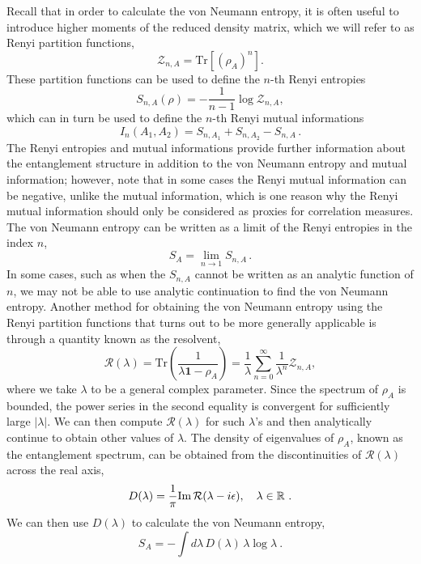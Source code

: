 \documentclass[a4paper,11pt]{article}
\newcommand\field[1]{{\ensuremath{\mathbb{{#1}}}}}
\newcommand{\RR}{\field{R}}
\newcommand{\be}{\begin{equation}}
\newcommand{\ee}{\end{equation}}
\newcommand\lam{\lambda}
\newcommand\sR{{\mathcal R}}
\newcommand\sZ{{\mathcal Z}}
\begin{document}
Recall that in order to calculate the von Neumann entropy, it is often useful to introduce higher moments of the reduced density matrix, which we will refer to as Renyi partition functions, 
 \be 
 \sZ_{n, A} = \text{Tr}[(\rho_{A})^n].
 \ee
 These partition functions can be used to define the $n$-th Renyi entropies 
 \be 
 S_{n, A}(\rho)= -\frac{1}{n-1}\log \sZ_{n, A}, 
 \ee
 which can in turn be used to define the $n$-th Renyi mutual informations
 \be 
I_n(A_1, A_2) = S_{n, A_1} +S_{n, A_2} - S_{n,A} \, . \label{ren_m}
\ee 
The Renyi entropies and mutual informations provide further information about the entanglement structure in addition to the von Neumann entropy and mutual information; however, note that in some cases the Renyi mutual information can be negative, unlike the mutual information, which is one reason why the Renyi mutual information should only be considered as proxies for correlation measures. The von Neumann entropy can be written as a limit of the Renyi entropies in the index $n$, 
\be 
S_{A} = \lim_{n\rightarrow 1} S_{n, A} \, . 
\ee
In some cases, such as when the $S_{n, A}$ cannot be written as an analytic function of $n$, we may not be able to use analytic continuation to find the von Neumann entropy. Another method for obtaining the von Neumann entropy using the Renyi partition functions that turns out to be more generally applicable is through a quantity known as the resolvent, 
\be 
\sR(\lambda) =\text{Tr}\left(\frac{1}{\lambda \mathbf{1} -\rho_A}\right) = \frac{1}{\lambda}\sum_{n=0}^{\infty} \frac{1}{\lambda^{n}} \sZ_{n,A}, 
\label{Rdef}
\ee 
where we take $\lam$ to be a general complex parameter. Since the spectrum of $\rho_A$ is bounded, the power series in the second equality is convergent for sufficiently large $|\lam|$. We can then compute $\sR(\lam)$ for such $\lam$'s and then analytically continue to obtain other values of $\lam$.
The density of eigenvalues of $\rho_A$, known as the entanglement spectrum, can be obtained from the discontinuities of $\sR(\lam)$ across the real axis, 
\be
D (\lam) = \frac{1}{\pi } {\rm Im} \, \sR(\lambda- i\epsilon), \quad \lam \in \RR \ .
\ee
We can then use $D(\lam)$ to calculate the von Neumann entropy, 
\be 
S_A = -\int d \lam \, D(\lam) \, \lam \log \lam \ .
\label{Sdef}
\ee
 
\end{document}
